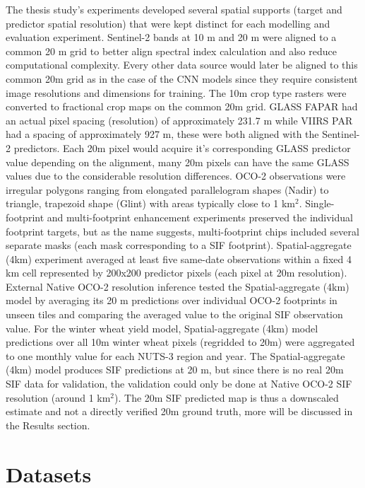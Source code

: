 The thesis study's experiments developed several spatial supports (target and predictor spatial resolution) that were kept distinct for each modelling and evaluation experiment. Sentinel-2 bands at 10 m and 20 m were aligned to a common 20 m grid to better align spectral index calculation and also reduce computational complexity. Every other data source would later be aligned to this common 20m grid as in the case of the CNN models since they require consistent image resolutions and dimensions for training. The 10m crop type rasters were converted to fractional crop maps on the common 20m grid. GLASS FAPAR had an actual pixel spacing (resolution) of approximately 231.7 m while VIIRS PAR had a spacing of approximately 927 m, these were both aligned with the Sentinel-2 predictors. Each 20m pixel would acquire it's corresponding GLASS predictor value depending on the alignment, many 20m pixels can have the same GLASS values due to the considerable resolution differences. OCO-2 observations were irregular polygons ranging from elongated parallelogram shapes (Nadir) to triangle, trapezoid shape (Glint) with areas typically close to 1 km$^2$. Single-footprint and multi-footprint enhancement experiments preserved the individual footprint targets, but as the name suggests, multi-footprint chips included several separate masks (each mask corresponding to a SIF footprint). Spatial-aggregate (4km) experiment averaged at least five same-date observations within a fixed 4 km cell represented by 200x200 predictor pixels (each pixel at 20m resolution). External Native OCO-2 resolution inference tested the Spatial-aggregate (4km) model by averaging its 20 m predictions over individual OCO-2 footprints in unseen tiles and comparing the averaged value to the original SIF observation value. For the winter wheat yield model, Spatial-aggregate (4km) model predictions over all 10m winter wheat pixels (regridded to 20m) were aggregated to one monthly value for each NUTS-3 region and year. The Spatial-aggregate (4km) model produces SIF predictions at 20 m, but since there is no real 20m SIF data for validation, the validation could only be done at Native OCO-2 SIF resolution (around 1 km$^2$). The 20m SIF predicted map is thus a downscaled estimate and not a directly verified 20m ground truth, more will be discussed in the Results section.

\section{Datasets\label{sec:datasets}}

